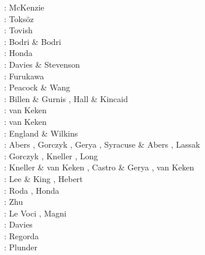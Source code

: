 \begin{scriptsize}
\nineteensixtynine: McKenzie \cite{mcke69}\\
\nineteenseventyone: Toks{\"o}z \etal \cite{tomj71}\\
\nineteenseventyeight: Tovish \etal \cite{tosl78}\\
\nineteenseventynine: Bodri \& Bodri \cite{bobo79}\\
\nineteeneightyfive: Honda \cite{hond85}\\
\nineteenninetytwo: Davies \& Stevenson \cite{dast92}\\
\nineteenninetythree: Furukawa \cite{furu93}\\
\nineteenninetynine: Peacock \& Wang \cite{pewa99}\\
\twothousandone: Billen \& Gurnis \cite{bigu01}, Hall \& Kincaid \cite{haki01}\\
\twothousandtwo: van Keken \etal \cite{vakp02}\\
\twothousandthree: van Keken \cite{vank03}\\
\twothousandfour: England \& Wilkins \cite{enwi04}\\
\twothousandsix: Abers \etal \cite{abvk06}, Gorczyk \etal \cite{gogc06},
                 Gerya \etal \cite{gecy06}, Syracuse \& Abers \cite{syab06},
                 Lassak \etal \cite{lafh06}\\
\twothousandseven: Gorczyk \etal \cite{gogc07}, Kneller \etal \cite{knvk07}, Long \etal \cite{lohd07}\\
\twothousandeight: Kneller \& van Keken \cite{knva08}, Castro \& Gerya \cite{cage08}, 
                   van Keken \etal \cite{vack08}\\
\twothousandnine: Lee \& King \cite{leki09}, Hebert \etal \cite{heaa09}\\
\twothousandten: Roda \etal \cite{roms10}, Honda \etal \cite{hogz10} \\
\twothousandeleven: Zhu \etal \cite{zhgh11}\\
\twothousandfourteen: Le Voci \etal \cite{ledg14}, Magni \etal \cite{mabv14}\\
\twothousandsixteen: Davies \etal \cite{dalg16} \\
\twothousandseventeen: Regorda \etal \cite{rerm17}\\
\twothousandeighteen: Plunder \etal \cite{pltv18}
\end{scriptsize}

